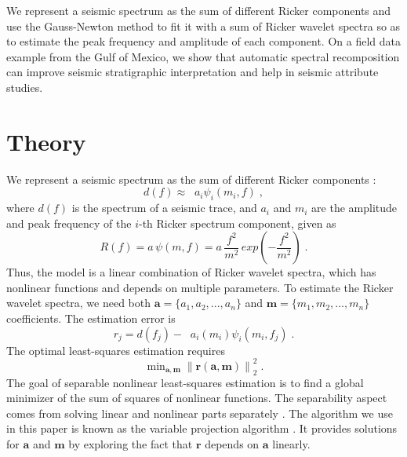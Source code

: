 We represent a seismic spectrum as the sum of different Ricker components and use the Gauss-Newton method to fit it with a sum of Ricker wavelet spectra so as to estimate the peak frequency and amplitude of each component. On a field data example from the Gulf of Mexico, we show that automatic spectral recomposition can improve seismic stratigraphic interpretation and help in seismic attribute studies.

\section{Theory}
We represent a seismic spectrum as the sum of different Ricker components \cite[]{Tomasso}:
\begin{equation}
d(f) \approx \mathop{\sum_{i=1}^{n}}a_i\psi_i(m_i,f)\;,
\end{equation}
where $d(f)$ is the spectrum of a seismic trace, and $a_i$ and $m_i$ are the amplitude and peak frequency of the $i$-th Ricker spectrum component, given as
\begin{equation}
\label{eq:ricker}
R(f)=a\,\psi(m,f)=a\,\frac{f^2}{m^2}\,{exp}{(-\frac{f^2}{m^2})}\;.
\end{equation}
Thus, the model is a linear combination of Ricker wavelet spectra, which has nonlinear functions and depends on multiple parameters. To estimate the Ricker wavelet spectra, we need both $\mathbf{a}=\{a_1,a_2,...,a_n\}$ and $\mathbf{m}=\{ m_1,m_2,...,m_n\}$ coefficients.
The estimation error is
\begin{equation}
r_j=d(f_j)-\mathop{\sum_{i=1}^{n}}a_i(m_i)\psi_i(m_i,f_j)\;.
\end{equation}
The optimal least-squares estimation requires
\begin{equation}
\mathop{\mbox{min}}_{\mathbf{a,m}}\left\|\mathbf{r}(\mathbf{a},\mathbf{m})\right\|_2^2\;.
\end{equation}
The goal of separable nonlinear least-squares estimation \cite[]{Ake} is to find a global minimizer of the sum of squares of nonlinear functions. The separability aspect comes from solving linear and nonlinear parts separately \cite[]{Scolnik}. The algorithm we use in this paper is known as the variable projection algorithm \cite[]{Golub}. It provides solutions for $\mathbf{a}$ and $\mathbf{m}$ by exploring the fact that $\mathbf{r}$ depends on $\mathbf{a}$ linearly.

